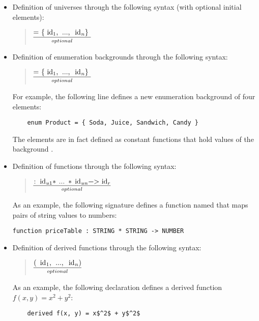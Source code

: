 \documentclass{article}
\newcommand{\optional}[1]{$\underset{optional}{\underline{\mbox{#1}}}$}
\begin{document}
\begin{itemize}
	\item Definition of universes through the following syntax (with optional initial elements):
	\begin{quote} 
	\optional{\asm{= \{ id$_1$, ..., id$_n$\} } } \end{quote}
	\item Definition of enumeration backgrounds through the following syntax:
	\begin{quote} 
		\optional{\asm{= \{ id$_1$, ..., id$_n$\} } } 
	\end{quote}
	For example, the following line defines a new enumeration background of four elements:

	\begin{lstlisting}
	enum Product = { Soda, Juice, Sandwich, Candy }
	\end{lstlisting}

	The elements are in fact defined as constant functions that hold values of the background . 

	\item Definition of functions through the following syntax:
	\begin{quote}
		\optional{\asm{: id$_{u1}$ * ... * id$_{un}$ -> id$_r$}}
	\end{quote}

	As an example, the following signature defines a function named  that maps pairs of string values to numbers:

	\begin{lstlisting}[autogobble=true]
	function priceTable : STRING * STRING -> NUMBER
	\end{lstlisting}

	\item Definition of derived functions through the following syntax:
	\begin{quote}
	\optional{\asm{( id$_1$, ..., id$_n$)}}
	\end{quote}
	
	As an example, the following declaration defines a derived function $f(x, y) = x^2 + y^2$: 

	\begin{lstlisting}
	derived f(x, y) = x$^2$ + y$^2$	
	\end{lstlisting}

\end{itemize}
\end{document}

